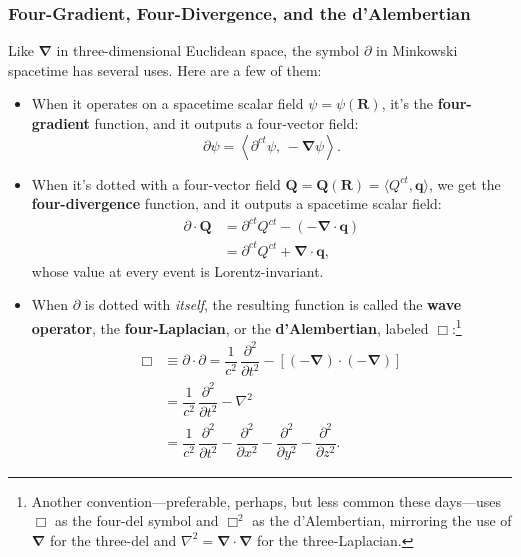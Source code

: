 \documentclass[12pt]{article}
\renewcommand{\vv}[1]{\mathbf{#1}}
\newcommand{\del}{\boldsymbol{\nabla}}
\begin{document}
\subsubsection{Four-Gradient, Four-Divergence, and the d'Alembertian}

Like $\del$ in three-dimensional Euclidean space, the symbol $\partialup$ in Minkowski spacetime has several uses. Here are a few of them:
\begin{itemize}
\item{
When it operates on a spacetime scalar field $\psi = \psi (\vv R)$, it's the \textbf{four-gradient} function, and it outputs a four-vector field:
\begin{equation*}
\partialup \psi = \left \langle \partial^{ct} \psi, \, -\del \psi \right \rangle.
\end{equation*}
}
\item{
When it's dotted with a four-vector field $\vv Q = \vv Q (\vv R) = \langle Q^{ct}, \vv q \rangle$, we get the \textbf{four-divergence} function, and it outputs a spacetime scalar field:
\begin{equation*}
\begin{split}
\partialup \cdot \vv Q &= \partial^{ct} Q^{ct} - \left( - \del \cdot \vv q \right) \\
&= \partial^{ct} Q^{ct} + \del \cdot \vv q ,
\end{split}
\end{equation*}
whose value at every event is Lorentz-invariant.
}
\item{
When $\partialup$ is dotted with \emph{itself}, the resulting function is called the \textbf{wave operator}, the \textbf{four-Laplacian}, or the \textbf{d'Alembertian}, labeled $\Box$:\footnote{Another convention---preferable, perhaps, but less common these days---uses $\Box$ as the four-del symbol and $\Box^2$ as the d'Alembertian, mirroring the use of $\del$ for the three-del and $\nabla ^2 = \del \cdot \del$ for the three-Laplacian.}
\begin{equation*}
\begin{split}
\Box &\equiv \partialup \cdot \partialup = \dfrac{1}{c^2} \, \dfrac{\partial^2}{\partial t^2} - \left[ \left( - \del \right) \cdot \left( - \del \right) \right] \\
&= \dfrac{1}{c^2} \, \dfrac{\partial^2}{\partial t^2} - \nabla ^2 \\[4pt]
&= \dfrac{1}{c^2} \, \dfrac{\partial^2}{\partial t^2} - \dfrac{\partial^2}{\partial x^2} - \dfrac{\partial^2}{\partial y^2} - \dfrac{\partial^2}{\partial z^2} .
\end{split}
\end{equation*}
}
\end{itemize}
\end{document}
